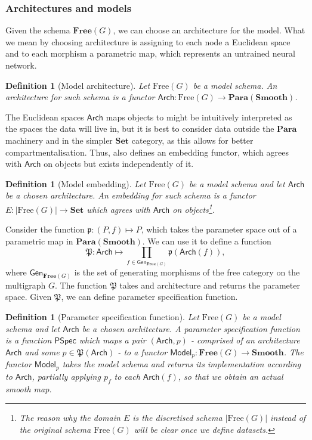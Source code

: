 \documentclass[11pt,a4paper,openright,twoside]{report}
\theoremstyle{plain}
\newtheorem{definition}[proposition]{Definition}
\theoremstyle{definition}
\begin{document}
\subsubsection{Architectures and models}


Given the schema $\mathbf{Free}(G)$, we can choose an architecture for the model. What we mean by choosing architecture is assigning to each node a Euclidean space and to each morphism a parametric map, which represents an untrained neural network.

\begin{definition}[Model architecture]
  Let $\mathrm{Free}(G)$ be a model schema. An architecture for such schema is a functor $\mathsf{Arch}: \mathrm{Free}(G) \to \mathbf{Para}(\mathbf{Smooth})$.
\end{definition}

The Euclidean spaces $\mathsf{Arch}$ maps objects to might be intuitively interpreted as the spaces the data will live in, but it is best to consider data outside the $\mathbf{Para}$ machinery and in the simpler $\mathbf{Set}$ category, as this allows for better compartmentalisation. Thus, \cite{gavranovicLearningFunctorsUsing2020} also defines an embedding functor, which agrees with $\mathsf{Arch}$ on objects but exists independently of it.


\begin{definition}[Model embedding]
  Let $\mathrm{Free}(G)$ be a model schema and let $\mathsf{Arch}$ be a chosen architecture. An embedding for such schema is a functor $E: |\mathrm{Free}(G)| \to \mathbf{Set}$ which agrees with $\mathsf{Arch}$ on objects\footnote{The reason why the domain $E$ is the discretised schema $|\mathrm{Free}(G)|$ instead of the original schema $\mathrm{Free}(G)$ will be clear once we define datasets.}.
\end{definition}

Consider the function $\mathfrak{p}: (P,f) \mapsto P$, which takes the parameter space out of a parametric map in $\mathbf{Para}(\mathbf{Smooth})$. We can use it to define a function 
\[\mathfrak{P}: \mathsf{Arch} \mapsto \prod_{f \in \mathsf{Gen}_{\mathbf{Free}(G)}}\mathfrak{p}(\mathsf{Arch}(f)),\]
where $\mathsf{Gen}_{\mathbf{Free}(G)}$ is the set of generating morphisms of the free category on the multigraph $G$. The function $\mathfrak{P}$ takes and architecture and returns the parameter space. Given $\mathfrak{P}$, we can define parameter specification function.

\begin{definition}[Parameter specification function]
  Let $\mathrm{Free}(G)$ be a model schema and let $\mathsf{Arch}$ be a chosen architecture. A parameter specification function is a function $\mathsf{PSpec}$ which maps a pair $(\mathsf{Arch}, p)$ - comprised of an architecture $\mathsf{Arch}$ and some $p \in \mathfrak{P}(\mathsf{Arch})$ - to a functor $\mathsf{Model}_p: \mathbf{Free}(G) \to \mathbf{Smooth}$. The functor $\mathsf{Model}_p$ takes the model schema and returns its implementation according to $\mathsf{Arch}$, partially applying $p_f$ to each $\mathsf{Arch}(f)$, so that we obtain an actual smooth map. 
\end{definition}
\end{document}
